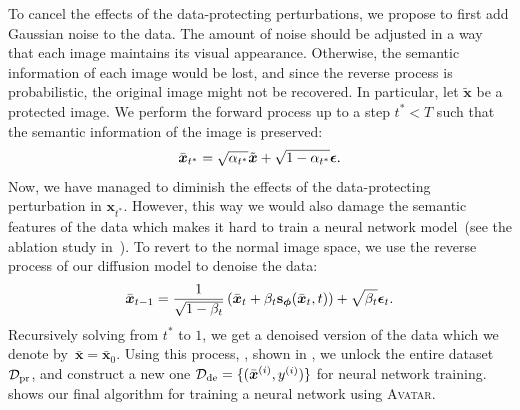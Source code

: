 \documentclass[conference]{IEEEtran}
\theoremstyle{definition}
\theoremstyle{remark}
\theoremstyle{proposition}
\begin{document}
To cancel the effects of the data-protecting perturbations, we propose to first add Gaussian noise to the data.
The amount of noise should be adjusted in a way that each image maintains its visual appearance.
Otherwise, the semantic information of each image would be lost, and since the reverse process is probabilistic, the original image might not be recovered.
In particular, let $\tilde{\boldsymbol{x}}$ be a protected image.
We perform the forward process up to a step $t^{*} < T$ such that the semantic information of the image is preserved:
\begin{equation}\label{eq:noise_addition}
    \small
    \bar{\boldsymbol{x}}_{t^{*}} =  \sqrt{\alpha_{t^{*}}} \tilde{\boldsymbol{x}} + \sqrt{1 - \alpha_{t^{*}}} \boldsymbol{\epsilon}.
\end{equation}
Now, we have managed to diminish the effects of the data-protecting perturbation in $\boldsymbol{x}_{t^{*}}$.
However, this way we would also damage the semantic features of the data which makes it hard to train a neural network model~(see the ablation study in~).
To revert to the normal image space, we use the reverse process of our diffusion model to denoise the data:
\begin{align}\label{eq:denoising}
    \small
    \bar{\boldsymbol{x}}_{t-1}=\frac{1}{\sqrt{1-\beta_{t}}}\left(\bar{\boldsymbol{x}}_{t}+\beta_{t} \mathbf{s}_{\boldsymbol{\phi}}(\bar{\boldsymbol{x}}_{t}, t)\right)+\sqrt{\beta_{t}} \boldsymbol{\epsilon}_{t}.
\end{align}
Recursively solving  from $t^{*}$ to $1$, we get a denoised version of the data which we denote by~${\bar{\boldsymbol{x}} = \bar{\boldsymbol{x}}_0}$.
Using this process, , shown in , we unlock the entire dataset $\mathcal{D}_{\rm pr}$, and construct a new one ${\mathcal{D}_{\rm de} = \{(\bar{\boldsymbol{x}}^{(i)}, y^{(i)})\}}$ for neural network training.
 shows our final algorithm for training a neural network using \textsc{Avatar}.
\end{document}
